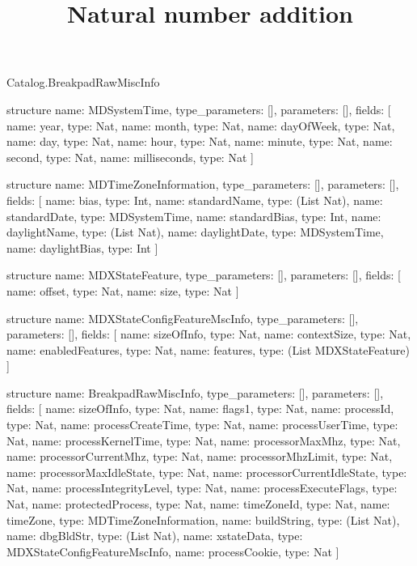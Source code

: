 \begin{lexlean}{Catalog.BreakpadRawMiscInfo}
\title{Natural number addition}
\begin{semanticmodule}
structure{
  name: MDSystemTime,
  type_parameters: [],
  parameters: [],
  fields: [
    {name: year, type: Nat},
    {name: month, type: Nat},
    {name: dayOfWeek, type: Nat},
    {name: day, type: Nat},
    {name: hour, type: Nat},
    {name: minute, type: Nat},
    {name: second, type: Nat},
    {name: milliseconds, type: Nat}
  ]
}

structure{
  name: MDTimeZoneInformation,
  type_parameters: [],
  parameters: [],
  fields: [
    {name: bias, type: Int},
    {name: standardName, type: (List Nat)},
    {name: standardDate, type: MDSystemTime},
    {name: standardBias, type: Int},
    {name: daylightName, type: (List Nat)},
    {name: daylightDate, type: MDSystemTime},
    {name: daylightBias, type: Int}
  ]
}

structure{
  name: MDXStateFeature,
  type_parameters: [],
  parameters: [],
  fields: [
    {name: offset, type: Nat},
    {name: size, type: Nat}
  ]
}

structure{
  name: MDXStateConfigFeatureMscInfo,
  type_parameters: [],
  parameters: [],
  fields: [
    {name: sizeOfInfo, type: Nat},
    {name: contextSize, type: Nat},
    {name: enabledFeatures, type: Nat},
    {name: features, type: (List MDXStateFeature)}
  ]
}

structure{
  name: BreakpadRawMiscInfo,
  type_parameters: [],
  parameters: [],
  fields: [
    {name: sizeOfInfo, type: Nat},
    {name: flags1, type: Nat},
    {name: processId, type: Nat},
    {name: processCreateTime, type: Nat},
    {name: processUserTime, type: Nat},
    {name: processKernelTime, type: Nat},
    {name: processorMaxMhz, type: Nat},
    {name: processorCurrentMhz, type: Nat},
    {name: processorMhzLimit, type: Nat},
    {name: processorMaxIdleState, type: Nat},
    {name: processorCurrentIdleState, type: Nat},
    {name: processIntegrityLevel, type: Nat},
    {name: processExecuteFlags, type: Nat},
    {name: protectedProcess, type: Nat},
    {name: timeZoneId, type: Nat},
    {name: timeZone, type: MDTimeZoneInformation},
    {name: buildString, type: (List Nat)},
    {name: dbgBldStr, type: (List Nat)},
    {name: xstateData, type: MDXStateConfigFeatureMscInfo},
    {name: processCookie, type: Nat}
  ]
}
\end{semanticmodule}
\end{lexlean}
